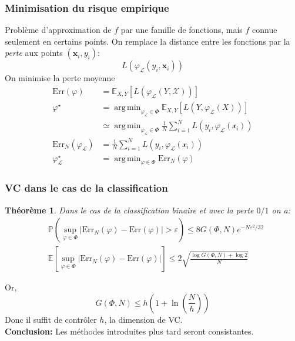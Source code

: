 \documentclass[dvipsnames,10pt]{beamer}
\DeclareMathOperator*{\argmin}{arg\,min}
\theoremstyle{plain}
\newtheorem{theoreme}{Théorème}
\theoremstyle{definition}
\begin{document}
\begin{frame}
\frametitle{Minimisation du risque empirique}
Problème d'approximation de $f$ par une famille de fonctions, mais $f$ connue seulement en certains points. On remplace la distance entre les fonctions par la \emph{perte} aux points $(\mathbf{x}_i,y_i)$:
\begin{equation*}
    L(\varphi_{\mathcal{L}} (y_i,\mathbf{x}_i))
\end{equation*}
On minimise la perte moyenne
\begin{align*}
    \mathrm{Err} \left( \varphi  \right) &= \mathbb{E}_{X,Y} \left[ L(\varphi_{\mathcal{L}} (Y,\mathcal{X})) \right] \\
    \varphi^\star &= \argmin_{\varphi_{\mathcal{L}} \in \Phi} \mathbb{E}_{X,Y} \left[ L\left(Y,\varphi_{\mathcal{L}}\left(X\right)\right) \right] \\
    &\simeq \argmin_{\varphi_{\mathcal{L}} \in \Phi} \frac{1}{N} \sum_{i=1}^N L\left(y_i,\varphi_{\mathcal{L}}\left(\mathcal{x}_i\right)\right) \\
    \mathrm{Err}_N \left( \varphi_{\mathcal{L}} \right) &= \frac{1}{N} \sum_{i=1}^N L\left(y_i,\varphi_{\mathcal{L}}\left(\mathcal{x}_i\right)\right) \\
    \varphi_{\mathcal{L}}^\star &= \argmin_{\varphi \in \Phi} \mathrm{Err}_N \left( \varphi  \right)
\end{align*}
\end{frame}

\begin{frame}
\frametitle{VC dans le cas de la classification}
\begin{theoreme}\label{thrm:vc}
    Dans le cas de la classification binaire et avec la perte $0/1$ on a:
    \begin{align}
        &\mathbb{P} \left( \sup_{\varphi \in \Phi} \vert \mathrm{Err}_N ( \varphi ) - \mathrm{Err} ( \varphi ) \vert > \varepsilon \right) \leq 8 G(\Phi,N) e^{-N \varepsilon^2 / 32} \\
        &\mathbb{E} \left[ \sup_{\varphi \in \Phi} \vert \mathrm{Err}_N ( \varphi ) - \mathrm{Err} ( \varphi ) \vert \right] \leq 2 \sqrt{\frac{\log G(\Phi,N) + \log 2 }{N}}
    \end{align}
\end{theoreme}
Or,
\begin{equation*}
    G(\Phi,N) \leq h \left( 1 + \ln \left( \frac{N}{h} \right) \right)
\end{equation*}
Donc il suffit de contrôler $h$, la dimension de VC. \\
\textbf{Conclusion:} Les méthodes introduites plus tard seront consistantes.
\end{frame}
\end{document}
